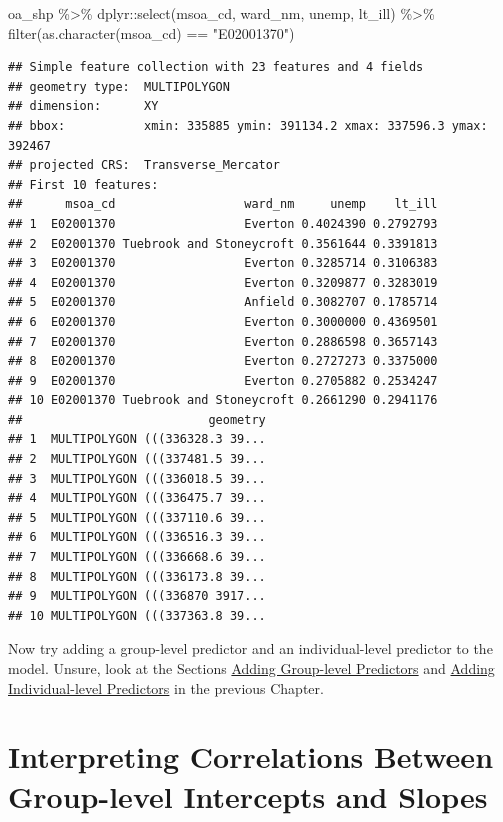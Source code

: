 \documentclass[
]{book}
\newenvironment{Shaded}{\begin{snugshade}}{\end{snugshade}}
\newcommand{\FunctionTok}[1]{\textcolor[rgb]{0.00,0.00,0.00}{#1}}
\newcommand{\NormalTok}[1]{#1}
\newcommand{\SpecialCharTok}[1]{\textcolor[rgb]{0.00,0.00,0.00}{#1}}
\newcommand{\StringTok}[1]{\textcolor[rgb]{0.31,0.60,0.02}{#1}}
\begin{document}
\begin{Shaded}
\begin{Highlighting}[]
\NormalTok{oa\_shp }\SpecialCharTok{\%\textgreater{}\%}\NormalTok{ dplyr}\SpecialCharTok{::}\FunctionTok{select}\NormalTok{(msoa\_cd, ward\_nm, unemp, lt\_ill) }\SpecialCharTok{\%\textgreater{}\%}
    \FunctionTok{filter}\NormalTok{(}\FunctionTok{as.character}\NormalTok{(msoa\_cd) }\SpecialCharTok{==} \StringTok{"E02001370"}\NormalTok{)}
\end{Highlighting}
\end{Shaded}

\begin{verbatim}
## Simple feature collection with 23 features and 4 fields
## geometry type:  MULTIPOLYGON
## dimension:      XY
## bbox:           xmin: 335885 ymin: 391134.2 xmax: 337596.3 ymax: 392467
## projected CRS:  Transverse_Mercator
## First 10 features:
##      msoa_cd                  ward_nm     unemp    lt_ill
## 1  E02001370                  Everton 0.4024390 0.2792793
## 2  E02001370 Tuebrook and Stoneycroft 0.3561644 0.3391813
## 3  E02001370                  Everton 0.3285714 0.3106383
## 4  E02001370                  Everton 0.3209877 0.3283019
## 5  E02001370                  Anfield 0.3082707 0.1785714
## 6  E02001370                  Everton 0.3000000 0.4369501
## 7  E02001370                  Everton 0.2886598 0.3657143
## 8  E02001370                  Everton 0.2727273 0.3375000
## 9  E02001370                  Everton 0.2705882 0.2534247
## 10 E02001370 Tuebrook and Stoneycroft 0.2661290 0.2941176
##                          geometry
## 1  MULTIPOLYGON (((336328.3 39...
## 2  MULTIPOLYGON (((337481.5 39...
## 3  MULTIPOLYGON (((336018.5 39...
## 4  MULTIPOLYGON (((336475.7 39...
## 5  MULTIPOLYGON (((337110.6 39...
## 6  MULTIPOLYGON (((336516.3 39...
## 7  MULTIPOLYGON (((336668.6 39...
## 8  MULTIPOLYGON (((336173.8 39...
## 9  MULTIPOLYGON (((336870 3917...
## 10 MULTIPOLYGON (((337363.8 39...
\end{verbatim}

Now try adding a group-level predictor and an individual-level predictor to the model. Unsure, look at the Sections \protect\hyperlink{adding-group-level-predictors}{Adding Group-level Predictors} and \protect\hyperlink{adding-individual-level-predictors}{Adding Individual-level Predictors} in the previous Chapter.

\hypertarget{interpreting-correlations-between-group-level-intercepts-and-slopes}{%
\section{Interpreting Correlations Between Group-level Intercepts and Slopes}\label{interpreting-correlations-between-group-level-intercepts-and-slopes}}
\end{document}
